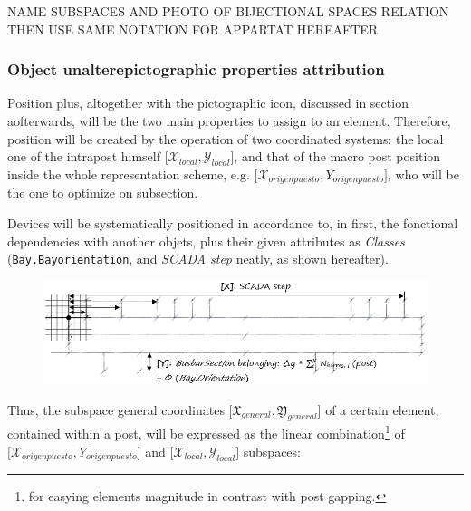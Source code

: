NAME SUBSPACES AND PHOTO OF BIJECTIONAL SPACES RELATION THEN USE SAME NOTATION FOR APPARTAT HEREAFTER

\subsubsection{Object unalterepictographic properties attribution}

\label{subsub:AIG:diagram-layout:object-picto- properties}

Position plus, altogether with the pictographic icon, discussed in  section aofterwards, will be the two main properties to assign to an element. Therefore, position will be created by the operation of two coordinated systems: the local one of the intrapost himself \(\lbrack \mathscr{X}_{local}, \mathscr{Y}_{local}  \rbrack \), and that of the macro post position inside the whole representation scheme, e.g. \(\lbrack \mathscr{X}_{origen puesto},{Y}_{origen puesto} \rbrack \), who will be the one to optimize on  subsection.

Devices will be systematically positioned in accordance to, in first, the fonctional dependencies with another objets, plus their given attributes as \textit{Classes} (\texttt{Bay.Bayorientation}, and \textit{SCADA step} neatly, as shown \hyperref[fig:post_draft]{hereafter}).

\begin{figure}[h]
    \centering
    \parbox[t]{1\textwidth}{
    {\centering
    \includegraphics[width=1\textwidth]{0.figuras/Draft-post-represenation.png}}
    \label{fig:post_draft}}
\end{figure}

Thus, the subspace general coordinates \(\lbrack \mathfrak{X}_{general}, \mathfrak{Y}_{general} \rbrack \) of a certain element, contained within a post, will be expressed as the linear combination\footnote{for easying elements magnitude in contrast with post gapping.} of \(\lbrack \mathscr{X}_{origen puesto},{Y}_{origen puesto} \rbrack \) and \(\lbrack \mathscr{X}_{local}, \mathscr{Y}_{local}  \rbrack \) subspaces:
\\


